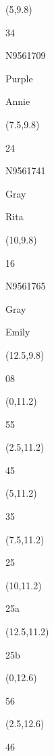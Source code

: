 \documentclass[a4paper]{article}
\newcommand{\myseat}[4]{%
\vspace{-0.1cm}
\parbox[t][2.2cm][t]{3.5cm}{
\small #1 %
\begin{description}
\vspace{-0.1cm}
\item [ID:] #2
\vspace{-0.1cm}
\item [Team:] #3 \normalsize
\vspace{-0.1cm}
\item \normalsize #4
\vspace{-0.1cm}
\end{description}
}
}
\begin{document}
\begin{CJK}{UTF8}{cyberbit}
\begin{textblock}{2.5}(5,9.8)
\myseat{34}{N9561709}{Purple}{Annie}
\end{textblock}

\begin{textblock}{2.5}(7.5,9.8)
\myseat{24}{N9561741}{Gray}{Rita}
\end{textblock}

\begin{textblock}{2.5}(10,9.8)
\myseat{16}{N9561765}{Gray}{Emily}
\end{textblock}

\begin{textblock}{2.5}(12.5,9.8)
\textblockcolor{}
\myseat{08}{}{}{}
\end{textblock}

\begin{textblock}{2.5}(0,11.2)
\textblockcolor{}
\myseat{55}{}{}{}
\end{textblock}

\begin{textblock}{2.5}(2.5,11.2)
\textblockcolor{}
\myseat{45}{}{}{}
\end{textblock}

\begin{textblock}{2.5}(5,11.2)
\textblockcolor{}
\myseat{35}{}{}{}
\end{textblock}

\begin{textblock}{2.5}(7.5,11.2)
\textblockcolor{}
\myseat{25}{}{}{}
\end{textblock}

\begin{textblock}{2.5}(10,11.2)
\textblockcolor{}
\myseat{25a}{}{}{}
\end{textblock}

\begin{textblock}{2.5}(12.5,11.2)
\textblockcolor{}
\myseat{25b}{}{}{}
\end{textblock}

\begin{textblock}{2.5}(0,12.6)
\textblockcolor{}
\myseat{56}{}{}{}
\end{textblock}

\begin{textblock}{2.5}(2.5,12.6)
\textblockcolor{}
\myseat{46}{}{}{}
\end{textblock}


\end{CJK}
\end{document}
